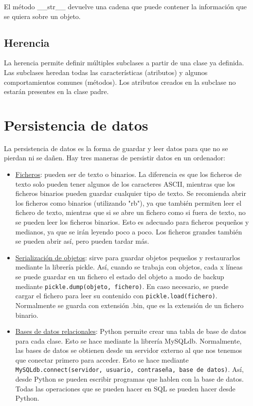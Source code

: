 El método \_\_str\_\_ devuelve una cadena que puede contener la información que se quiera sobre un objeto.

\subsection{Herencia}
La herencia permite definir múltiples subclases a partir de una clase ya definida. Las subclases heredan todas las características (atributos) y algunos comportamientos comunes (métodos). Los atributos creados en la subclase no estarán presentes en la clase padre.

\section{Persistencia de datos}
La persistencia de datos es la forma de guardar y leer datos para que no se pierdan ni se dañen. Hay tres maneras de persistir datos en un ordenador: 
\begin{itemize}
\item \underline{Ficheros}: pueden ser de texto o binarios. La diferencia es que los ficheros de texto solo pueden tener algunos de los caracteres ASCII, mientras que los ficheros binarios pueden guardar cualquier tipo de texto. Se recomienda abrir los ficheros como binarios (utilizando "rb"), ya que también permiten leer el fichero de texto, mientras que si se abre un fichero como si fuera de texto, no se pueden leer los ficheros binarios. Esto es adecuado para ficheros pequeños y medianos, ya que se irán leyendo poco a poco. Los ficheros grandes también se pueden abrir así, pero pueden tardar más.
\item \underline{Serialización de objetos}: sirve para guardar objetos pequeños y restaurarlos mediante la librería pickle. Así, cuando se trabaja con objetos, cada x líneas se puede guardar en un fichero el estado del objeto a modo de backup mediante \texttt{pickle.dump(objeto, fichero)}. En caso necesario, se puede cargar el fichero para leer su contenido con \texttt{pickle.load(fichero)}. Normalmente se guarda con extensión .bin, que es la extensión de un fichero binario.
\item \underline{Bases de datos relacionales}: Python permite crear una tabla de base de datos para cada clase. Esto se hace mediante la librería MySQLdb. Normalmente, las bases de datos se obtienen desde un servidor externo al que nos tenemos que conectar primero para acceder. Esto se hace mediante \texttt{MySQLdb.connect(servidor, usuario, contraseña, base de datos)}. Así, desde Python se pueden escribir programas que hablen con la base de datos. Todas las operaciones que se pueden hacer en SQL se pueden hacer desde Python.
\end{itemize}
